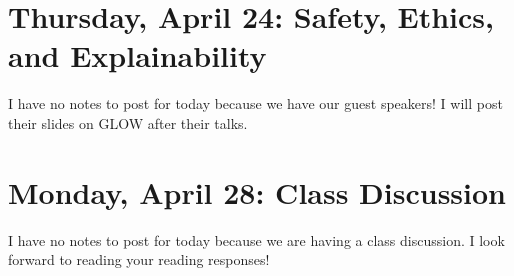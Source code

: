 \section{Thursday, April 24: Safety, Ethics, and Explainability}

I have no notes to post for today because we have our guest speakers! I will post their slides on GLOW after their talks. 

\section{Monday, April 28: Class Discussion}

I have no notes to post for today because we are having a class discussion. I look forward to reading your reading responses!


